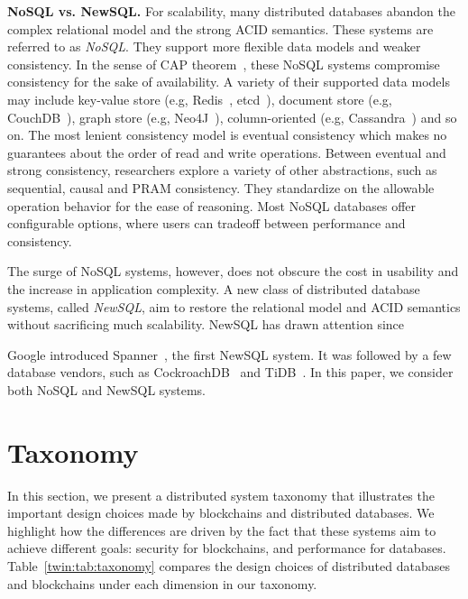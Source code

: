 \textbf{NoSQL vs. NewSQL.}
For scalability, many distributed databases abandon the complex relational model and
the strong ACID semantics. 
These systems are referred to as {\em NoSQL}. They support more flexible data models and weaker consistency. 
In the sense of CAP theorem~\cite{gilbert2012perspectives}, these NoSQL systems compromise consistency for the sake of availability. 
A variety of their supported data models may include key-value store (e.g, Redis~\cite{carlson2013redis}, etcd~\cite{web:etcd}), 
document store (e.g, CouchDB~\cite{anderson2010couchdb}), graph store (e.g, Neo4J~\cite{vukotic2014neo4j}), column-oriented (e.g, Cassandra~\cite{lakshman2010cassandra}) and so on. 
The most lenient consistency model is eventual consistency which makes no guarantees about the order
of read and write operations. 
Between eventual and strong consistency, researchers explore a variety of other abstractions, such as sequential, causal and PRAM consistency. They standardize on the allowable operation behavior for the ease of reasoning. 
Most NoSQL databases offer configurable options, where users can tradeoff between performance and consistency.

The surge of NoSQL systems, however, does not obscure the cost in usability and
the increase in application complexity.  A new class of distributed database systems, called {\em NewSQL}, aim to restore the relational model and ACID semantics without sacrificing much scalability.  
NewSQL has drawn attention since 

Google introduced Spanner~\cite{corbett2013spanner}, the first NewSQL system. It was followed by a few database vendors, such as CockroachDB~\cite{taft2020cockroachdb} and TiDB~\cite{huang13tidb}. In this paper, we consider both NoSQL and NewSQL systems.

\section{Taxonomy}
\label{twin:sec:anatomy}
In this section, we present a distributed system taxonomy that illustrates the important design choices made
by blockchains and distributed databases. We highlight how the differences are driven by the fact that these
systems aim to achieve different goals: security for blockchains, and performance for databases.  
Table~\ref{twin:tab:taxonomy} compares the design choices of distributed databases and blockchains under each dimension in our taxonomy. 

